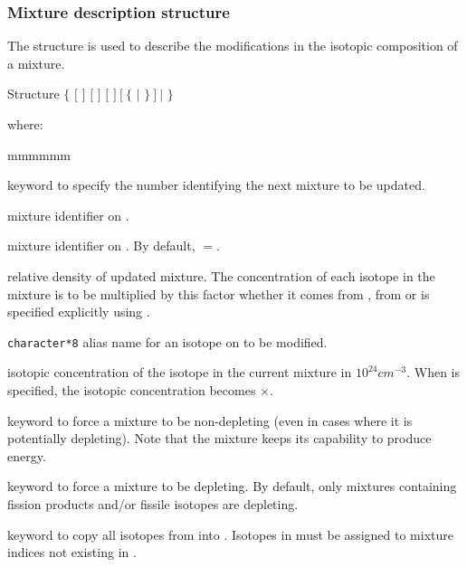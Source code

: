 \vskip 0.25cm
\goodbreak

\subsubsection{Mixture description structure}\label{sect:descmix2}

The structure  is used to describe the modifications in the isotopic composition of a mixture.

\begin{DataStructure}{Structure }
$\{$    $[$  $]$ $[$  $]$
$[$   $]~[~\{$  $|$  $\}~]~|$  $\}$
\end{DataStructure}

\vspace{-0.15cm}

\noindent
where:

\begin{ListeDeDescription}{mmmmmm}

\item[\moc{MIX}] keyword to specify the number identifying the next mixture to
be updated.

\item[\dusa{matnum}] mixture identifier on . 

\item[\dusa{matold}] mixture identifier on . By default, $=$.

\item[\dusa{relden}] relative density of updated mixture. The  concentration
of each isotope in the mixture is to be multiplied by this factor whether it 
comes from , from  or is
specified explicitly using . 

\item[\dusa{NAMALI}] {\tt character*8} alias name for an isotope on
 to be modified. 

\item[\dusa{dens}] isotopic concentration of the isotope  in the
current mixture in $10^{24}cm^{-3}$.  When  is specified, the
isotopic concentration becomes $\times$.

\item[\moc{NOEV}] keyword to force a mixture to be non-depleting (even in
cases where it is potentially depleting). Note that the mixture keeps its
capability to produce energy.

\item[\moc{EVOL}] keyword to force a mixture to be depleting. By default, only
mixtures containing fission products and/or fissile isotopes are depleting.

\item[\moc{ALL}] keyword to copy all isotopes from  into . Isotopes in 
must be assigned to mixture indices not existing in .

\end{ListeDeDescription}

